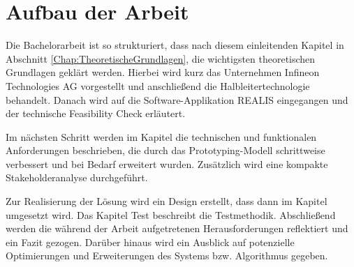 \section{Aufbau der Arbeit}
Die Bachelorarbeit ist so strukturiert, dass nach diesem einleitenden Kapitel in Abschnitt \ref{Chap:TheoretischeGrundlagen}, die wichtigsten theoretischen Grundlagen geklärt werden. 
Hierbei wird kurz das Unternehmen Infineon Technologies AG vorgestellt und anschließend die Halbleitertechnologie behandelt. Danach wird auf die Software-Applikation \gls{REALIS} eingegangen und der technische Feasibility Check erläutert.

Im nächsten Schritt werden im Kapitel  die technischen und funktionalen Anforderungen beschrieben, die durch das Prototyping-Modell schrittweise verbessert und bei Bedarf erweitert wurden. Zusätzlich wird eine kompakte Stakeholderanalyse durchgeführt.

Zur Realisierung der Lösung wird ein Design erstellt, dass dann im Kapitel  umgesetzt wird. Das Kapitel Test beschreibt die Testmethodik. Abschließend werden die während der Arbeit aufgetretenen Herausforderungen reflektiert und ein Fazit gezogen. Darüber hinaus wird ein Ausblick auf potenzielle Optimierungen und Erweiterungen des Systems bzw. Algorithmus gegeben.